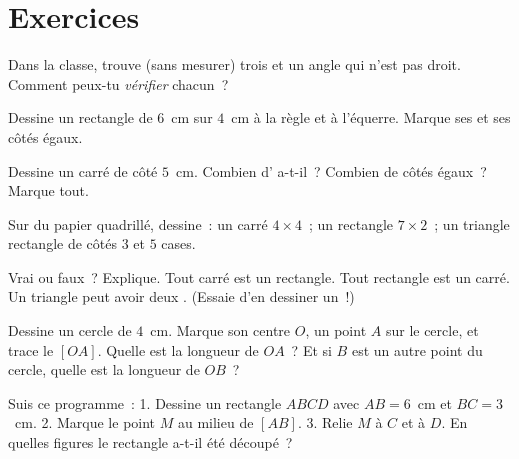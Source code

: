 \section{Exercices}

\begin{exercise}[$\star$]\label{exo:g3:shapes:1}
Dans la classe, trouve (sans mesurer) trois  et un
angle qui n'est pas droit. Comment peux-tu \emph{vérifier} chacun~?
\end{exercise}

\begin{exercise}[$\star$]\label{exo:g3:shapes:2}
Dessine un rectangle de $6$~cm sur $4$~cm à la règle et à
l'équerre. Marque ses  et ses côtés égaux.
\end{exercise}

\begin{exercise}[$\star$]\label{exo:g3:shapes:3}
Dessine un carré de côté $5$~cm. Combien d'
a-t-il~? Combien de côtés égaux~? Marque tout.
\end{exercise}

\begin{exercise}[$\star$]\label{exo:g3:shapes:4}
Sur du papier quadrillé, dessine~: un carré $4 \times 4$~; un
rectangle $7 \times 2$~; un triangle rectangle de côtés $3$ et
$5$ cases.
\end{exercise}

\begin{exercise}[$\star$]\label{exo:g3:shapes:5}
Vrai ou faux~? Explique.
\guillemotleft{} Tout carré est un rectangle. \guillemotright{}
\quad \guillemotleft{} Tout rectangle est un carré.
\guillemotright{} \quad \guillemotleft{} Un triangle peut avoir deux
. \guillemotright{} (Essaie d'en dessiner un~!)
\end{exercise}

\begin{exercise}[$\star$]\label{exo:g3:shapes:6}
Dessine un cercle de  $4$~cm. Marque son centre $O$, un point
$A$ sur le cercle, et trace le  $[OA]$. Quelle est la longueur
de $OA$~? Et si $B$ est un autre point du cercle, quelle est la
longueur de $OB$~?
\end{exercise}

\begin{exercise}[$\star$]\label{exo:g3:shapes:7}
Suis ce programme~: \guillemotleft{} 1. Dessine un rectangle $ABCD$
avec $AB = 6$~cm et $BC = 3$~cm. 2. Marque le point $M$ au milieu de
$[AB]$. 3. Relie $M$ à $C$ et à $D$. \guillemotright{} En
quelles figures le rectangle a-t-il été découpé~?
\end{exercise}

